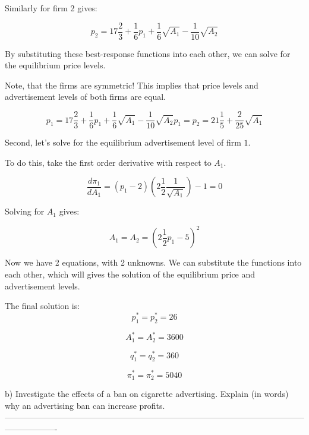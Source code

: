 \documentclass[12pt,english]{article}%
\begin{document}
Similarly for firm 2 gives:

\begin{equation}
p_2=17\frac{2}{3}+\frac{1}{6}p_1+\frac{1}{6}\sqrt{A_1}-\frac{1}{10}\sqrt{A_2}
\end{equation}

By substituting these best-response functions into each other, we can solve for the equilibrium price levels. 

Note, that the firms are symmetric! This implies that price levels and advertisement levels of both firms are equal. 

\begin{equation}
p_1=17\frac{2}{3}+\frac{1}{6}p_1+\frac{1}{6}\sqrt{A_1}-\frac{1}{10}\sqrt{A_2}
p_1=p_2=21\frac{1}{5}+\frac{2}{25}\sqrt{A_1}
\end{equation}

Second, let's solve for the equilibrium advertisement level of firm $1$.

To do this, take the first order derivative with respect to $A_1$.

\begin{equation}
\frac{d\pi_1}{dA_1}=(p_1-2)(2\frac{1}{2}\frac{1}{\sqrt{A_1}})-1=0
\end{equation}

Solving for $A_1$ gives:

\begin{equation}
A_1=A_2=(2\frac{1}{2}p_1-5)^2
\end{equation}

Now we have 2 equations, with 2 unknowns. We can substitute the functions into each other, which will gives the solution of the equilibrium price and advertisement levels. 

The final solution is:
\begin{equation}
p_1^*=p_2^*=26
\end{equation}

\begin{equation}
A_1^*=A_2^*=3600
\end{equation}

\begin{equation}
q_1^*=q_2^*=360
\end{equation}

\begin{equation}
\pi_1^*=\pi_2^*=5040
\end{equation}

b) Investigate the effects of a ban on cigarette advertising. Explain (in words) why an advertising ban can increase profits. 
-------------------------------------------------------------------------------------------------------------------------------
\end{document}
